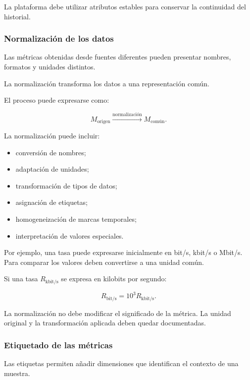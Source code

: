 La plataforma debe utilizar atributos estables para conservar la
continuidad del historial.


\subsubsection*{Normalización de los datos}

Las métricas obtenidas desde fuentes diferentes pueden presentar nombres,
formatos y unidades distintos.

La normalización transforma los datos a una representación común.

El proceso puede expresarse como:

\[
    M_{\mathrm{origen}}
    \xrightarrow{\text{normalización}}
    M_{\mathrm{común}}.
\]

La normalización puede incluir:

\begin{itemize}
    \item conversión de nombres;

    \item adaptación de unidades;

    \item transformación de tipos de datos;

    \item asignación de etiquetas;

    \item homogeneización de marcas temporales;

    \item interpretación de valores especiales.
\end{itemize}

Por ejemplo, una tasa puede expresarse inicialmente en bit/s, kbit/s o
Mbit/s. Para comparar los valores deben convertirse a una unidad común.

Si una tasa \(R_{\mathrm{kbit/s}}\) se expresa en kilobits por segundo:

\[
    R_{\mathrm{bit/s}}
    =
    10^3
    R_{\mathrm{kbit/s}}.
\]

La normalización no debe modificar el significado de la métrica. La
unidad original y la transformación aplicada deben quedar documentadas.


\subsubsection*{Etiquetado de las métricas}

Las etiquetas permiten añadir dimensiones que identifican el contexto de
una muestra.

